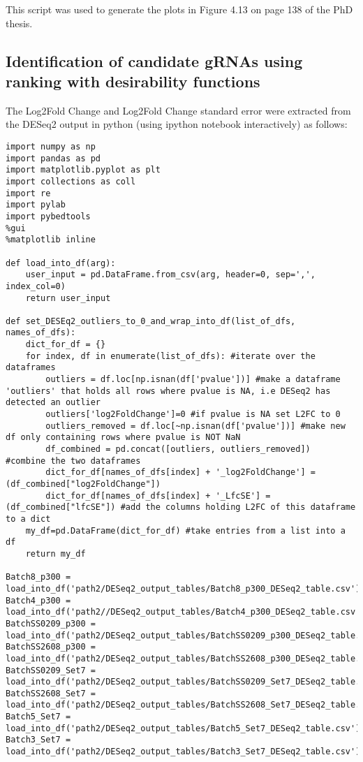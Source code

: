 This script was used to generate the plots in Figure 4.13 on page 138 of the PhD thesis.

\subsection{Identification of candidate gRNAs using ranking with desirability functions}
\label{sec:ranking-methods}
The Log2Fold Change and Log2Fold Change standard error were extracted from the DESeq2 output in python (using ipython notebook interactively) as follows:

\begin{small}\begin{lstlisting}
import numpy as np
import pandas as pd
import matplotlib.pyplot as plt
import collections as coll
import re
import pylab
import pybedtools
%gui 
%matplotlib inline

def load_into_df(arg):
    user_input = pd.DataFrame.from_csv(arg, header=0, sep=',', index_col=0)
    return user_input

def set_DESEq2_outliers_to_0_and_wrap_into_df(list_of_dfs, names_of_dfs):
    dict_for_df = {} 
    for index, df in enumerate(list_of_dfs): #iterate over the dataframes
        outliers = df.loc[np.isnan(df['pvalue'])] #make a dataframe 'outliers' that holds all rows where pvalue is NA, i.e DESeq2 has detected an outlier
        outliers['log2FoldChange']=0 #if pvalue is NA set L2FC to 0
        outliers_removed = df.loc[~np.isnan(df['pvalue'])] #make new df only containing rows where pvalue is NOT NaN
        df_combined = pd.concat([outliers, outliers_removed])   #combine the two dataframes
        dict_for_df[names_of_dfs[index] + '_log2FoldChange'] = (df_combined["log2FoldChange"])
        dict_for_df[names_of_dfs[index] + '_LfcSE'] = (df_combined["lfcSE"]) #add the columns holding L2FC of this dataframe to a dict
    my_df=pd.DataFrame(dict_for_df) #take entries from a list into a df
    return my_df

Batch8_p300 = load_into_df('path2/DESeq2_output_tables/Batch8_p300_DESeq2_table.csv')
Batch4_p300 = load_into_df('path2//DESeq2_output_tables/Batch4_p300_DESeq2_table.csv')
BatchSS0209_p300 = load_into_df('path2/DESeq2_output_tables/BatchSS0209_p300_DESeq2_table.csv')
BatchSS2608_p300 = load_into_df('path2/DESeq2_output_tables/BatchSS2608_p300_DESeq2_table.csv')
BatchSS0209_Set7 = load_into_df('path2/DESeq2_output_tables/BatchSS0209_Set7_DESeq2_table.csv')
BatchSS2608_Set7 = load_into_df('path2/DESeq2_output_tables/BatchSS2608_Set7_DESeq2_table.csv')
Batch5_Set7 = load_into_df('path2/DESeq2_output_tables/Batch5_Set7_DESeq2_table.csv')
Batch3_Set7 = load_into_df('path2/DESeq2_output_tables/Batch3_Set7_DESeq2_table.csv')


\end{lstlisting}
\end{small}
